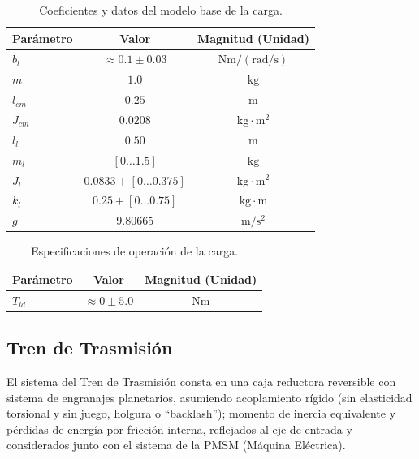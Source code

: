 \documentclass[blue,fullpaper]{ludusofficial}  %
\begin{document}
\begin{table}[htbp]
    \centering
    \caption{Coeficientes y datos del modelo base de la carga.}
    \label{tab:parametros_carga}
    \begin{tabular}{lcc}
        \hline
        \textbf{Parámetro} & \textbf{Valor} & \textbf{Magnitud (Unidad)} \\
        \hline
        $b_l$ & $\approx 0.1 \pm 0.03$ & $\mathrm{Nm / (rad/s)}$ \\
        $m$ & $1.0$ & $\mathrm{kg}$ \\
        $l_{cm}$ & $0.25$ & $\mathrm{m}$ \\
        $J_{cm}$ & $0.0208$ & $\mathrm{kg \cdot m^{2}}$ \\
        $l_l$ & $0.50$ & $\mathrm{m}$ \\
        $m_l$ & $[0 \dots 1.5]$ & $\mathrm{kg}$ \\
        $J_l$ & $0.0833 + [0 \dots 0.375]$ & $\mathrm{kg \cdot m^{2}}$ \\
        $k_l$ & $0.25 + [0 \dots 0.75]$ & $\mathrm{kg \cdot m}$ \\
        $g$ & $9.80665$ & $\mathrm{m/s^2}$ \\
        \hline
    \end{tabular}
\end{table}

\begin{table}[htbp]
    \centering
    \caption{Especificaciones de operación de la carga.}
    \label{tab:parametros_carga}
    \begin{tabular}{lcc}
        \hline
        \textbf{Parámetro} & \textbf{Valor} & \textbf{Magnitud (Unidad)} \\
        \hline
        $T_{ld}$ & $\approx 0 \pm 5.0$ & $\mathrm{Nm}$ \\
        \hline
    \end{tabular}
\end{table}


\subsection{Tren de Trasmisión}

El sistema del Tren de Trasmisión consta en una caja reductora reversible con sistema de engranajes planetarios, asumiendo acoplamiento rígido (sin elasticidad torsional y sin juego, holgura o “backlash”); momento de inercia equivalente y pérdidas de energía por fricción interna, reflejados al eje de entrada y considerados junto con el sistema de la PMSM (Máquina Eléctrica).
\end{document}
